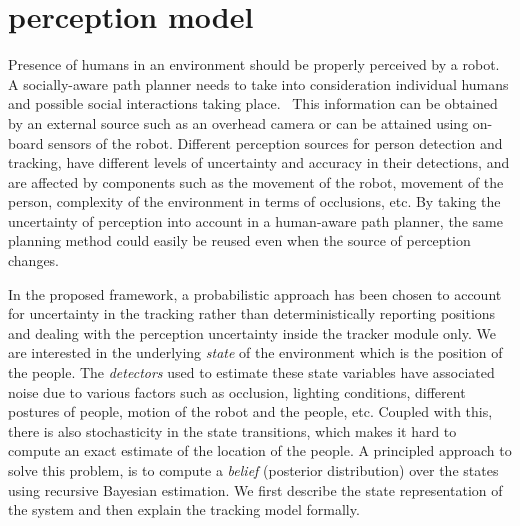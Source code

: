 \section{perception model}
\label{perception_model}


Presence of humans in an environment should be properly perceived by a robot. A socially-aware path planner needs to take into consideration individual humans and possible social interactions taking place.%
~This information can be obtained by an external source such as an overhead camera or can be attained using on-board sensors of the robot. Different perception sources for person detection and tracking, have different levels of uncertainty and accuracy in their detections, and are affected by components such as the movement of the robot, movement of the person, complexity of the environment in terms of occlusions, etc. By taking the uncertainty of perception into account in a human-aware path planner, the same planning method could easily be reused even when the source of perception changes. 

In the proposed framework, a probabilistic approach has been chosen to account for uncertainty in the tracking rather than deterministically reporting positions and dealing with the perception uncertainty inside the tracker module only. We are interested in the underlying \textit{state} of the environment which is the position of the people. The \textit{detectors} used to estimate these state variables have associated noise due to various factors such as occlusion, lighting conditions, different postures of people, motion of the robot and the people, etc. Coupled with this, there is also stochasticity in the state transitions, which makes it hard to compute an exact estimate of the location of the people. A principled approach to solve this problem, is to compute a \textit{belief} (posterior distribution) over the states using recursive Bayesian estimation. We first describe the state representation of the system and then explain the tracking model formally.

